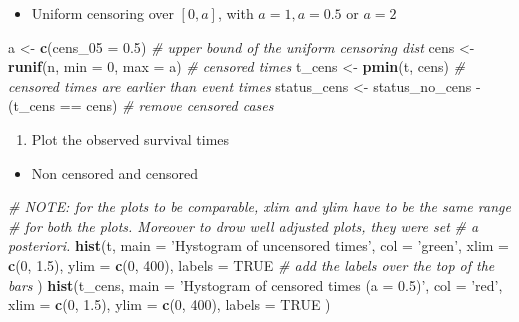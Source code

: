 \documentclass[]{book}
\newenvironment{Shaded}{\begin{snugshade}}{\end{snugshade}}
\newcommand{\KeywordTok}[1]{\textcolor[rgb]{0.13,0.29,0.53}{\textbf{{#1}}}}
\newcommand{\DataTypeTok}[1]{\textcolor[rgb]{0.13,0.29,0.53}{{#1}}}
\newcommand{\DecValTok}[1]{\textcolor[rgb]{0.00,0.00,0.81}{{#1}}}
\newcommand{\FloatTok}[1]{\textcolor[rgb]{0.00,0.00,0.81}{{#1}}}
\newcommand{\StringTok}[1]{\textcolor[rgb]{0.31,0.60,0.02}{{#1}}}
\newcommand{\CommentTok}[1]{\textcolor[rgb]{0.56,0.35,0.01}{\textit{{#1}}}}
\newcommand{\OtherTok}[1]{\textcolor[rgb]{0.56,0.35,0.01}{{#1}}}
\newcommand{\NormalTok}[1]{{#1}}
\providecommand{\tightlist}{%
  \setlength{\itemsep}{0pt}\setlength{\parskip}{0pt}}
\theoremstyle{definition}
\theoremstyle{definition}
\theoremstyle{definition}
\theoremstyle{remark}
\begin{document}
\begin{itemize}
\tightlist
\item
  Uniform censoring over \([0, a]\), with \(a = 1, a = 0.5\) or
  \(a = 2\)
\end{itemize}

\begin{Shaded}
\begin{Highlighting}[]
\NormalTok{a              <-}\StringTok{ }\KeywordTok{c}\NormalTok{(}\DataTypeTok{cens_05 =} \FloatTok{0.5}\NormalTok{)   }\CommentTok{# upper bound of the uniform censoring dist}
\NormalTok{cens           <-}\StringTok{ }\KeywordTok{runif}\NormalTok{(n, }\DataTypeTok{min =} \DecValTok{0}\NormalTok{, }\DataTypeTok{max =} \NormalTok{a)                    }\CommentTok{# censored times}
\NormalTok{t_cens         <-}\StringTok{ }\KeywordTok{pmin}\NormalTok{(t, cens)    }\CommentTok{# censored times are earlier than event times}
\NormalTok{status_cens    <-}\StringTok{ }\NormalTok{status_no_cens -}\StringTok{ }\NormalTok{(t_cens ==}\StringTok{ }\NormalTok{cens)      }\CommentTok{# remove censored cases}
\end{Highlighting}
\end{Shaded}

\begin{enumerate}
\def\labelenumi{\arabic{enumi}.}
\setcounter{enumi}{1}
\tightlist
\item
  Plot the observed survival times
\end{enumerate}

\begin{itemize}
\tightlist
\item
  Non censored and censored
\end{itemize}

\begin{Shaded}
\begin{Highlighting}[]
\CommentTok{# NOTE: for the plots to be comparable, xlim and ylim have to be the same range}
\CommentTok{#       for both the plots. Moreover to drow well adjusted plots, they were set}
\CommentTok{#       a posteriori.}
\KeywordTok{hist}\NormalTok{(t,}
  \DataTypeTok{main =} \StringTok{'Hystogram of uncensored times'}\NormalTok{,}
  \DataTypeTok{col  =} \StringTok{'green'}\NormalTok{,}
  \DataTypeTok{xlim =} \KeywordTok{c}\NormalTok{(}\DecValTok{0}\NormalTok{, }\FloatTok{1.5}\NormalTok{),}
  \DataTypeTok{ylim =} \KeywordTok{c}\NormalTok{(}\DecValTok{0}\NormalTok{, }\DecValTok{400}\NormalTok{),}
  \DataTypeTok{labels =} \OtherTok{TRUE}                        \CommentTok{# add the labels over the top of the bars}
\NormalTok{)}
\KeywordTok{hist}\NormalTok{(t_cens,}
  \DataTypeTok{main =} \StringTok{'Hystogram of censored times (a = 0.5)'}\NormalTok{,}
  \DataTypeTok{col  =} \StringTok{'red'}\NormalTok{,}
  \DataTypeTok{xlim =} \KeywordTok{c}\NormalTok{(}\DecValTok{0}\NormalTok{, }\FloatTok{1.5}\NormalTok{),}
  \DataTypeTok{ylim =} \KeywordTok{c}\NormalTok{(}\DecValTok{0}\NormalTok{, }\DecValTok{400}\NormalTok{),}
  \DataTypeTok{labels =} \OtherTok{TRUE}
\NormalTok{)}
\end{Highlighting}
\end{Shaded}
\end{document}
